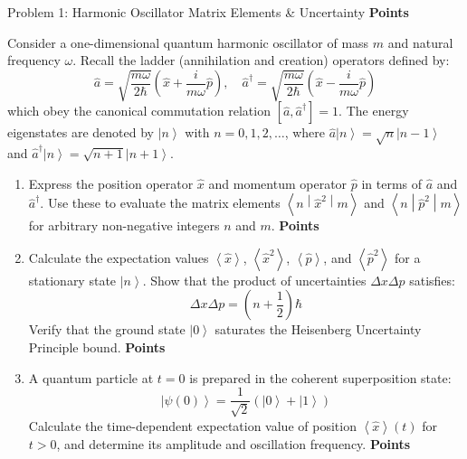 \documentclass[11pt, a4paper, parskip=half]{scrartcl}
\newcommand{\ket}[1]{\left| #1 \right\rangle}
\newcommand{\mel}[3]{\left\langle #1 \middle| #2 \middle| #3 \right\rangle}
\newcommand{\comm}[2]{\left[ #1, #2 \right]}
\newcommand{\expval}[1]{\left\langle #1 \right\rangle}
\newcommand{\points}[1]{\hfill{\sffamily\bfseries\color{QMAccent}\lbrack #1 Points\rbrack}}
\begin{document}
\vspace{2mm}

\begin{problembox}{Problem 1: Harmonic Oscillator Matrix Elements \& Uncertainty \points{30}}

Consider a one-dimensional quantum harmonic oscillator of mass $m$ and natural frequency $\omega$. Recall the ladder (annihilation and creation) operators defined by:
\[
\hat{a} = \sqrt{\frac{m\omega}{2\hbar}} \left( \hat{x} + \frac{i}{m\omega} \hat{p} \right), \quad 
\hat{a}^\dagger = \sqrt{\frac{m\omega}{2\hbar}} \left( \hat{x} - \frac{i}{m\omega} \hat{p} \right)
\]
which obey the canonical commutation relation $\comm{\hat{a}}{\hat{a}^\dagger} = 1$. The energy eigenstates are denoted by $\ket{n}$ with $n = 0, 1, 2, \dots$, where $\hat{a}\ket{n} = \sqrt{n}\ket{n-1}$ and $\hat{a}^\dagger\ket{n} = \sqrt{n+1}\ket{n+1}$.

\begin{enumerate}[label=\bfseries(\alph*), leftmargin=*, itemsep=3pt]
  \item Express the position operator $\hat{x}$ and momentum operator $\hat{p}$ in terms of $\hat{a}$ and $\hat{a}^\dagger$. Use these to evaluate the matrix elements $\mel{n}{\hat{x}^2}{m}$ and $\mel{n}{\hat{p}^2}{m}$ for arbitrary non-negative integers $n$ and $m$. \points{12}
  
  \item Calculate the expectation values $\expval{\hat{x}}$, $\expval{\hat{x}^2}$, $\expval{\hat{p}}$, and $\expval{\hat{p}^2}$ for a stationary state $\ket{n}$. Show that the product of uncertainties $\Delta x \Delta p$ satisfies:
  \[
  \Delta x \Delta p = \left( n + \frac{1}{2} \right) \hbar
  \]
  Verify that the ground state $\ket{0}$ saturates the Heisenberg Uncertainty Principle bound. \points{10}
  
  \item A quantum particle at $t=0$ is prepared in the coherent superposition state:
  \[
  \ket{\psi(0)} = \frac{1}{\sqrt{2}} \left( \ket{0} + \ket{1} \right)
  \]
  Calculate the time-dependent expectation value of position $\expval{\hat{x}}(t)$ for $t > 0$, and determine its amplitude and oscillation frequency. \points{8}
\end{enumerate}

\end{problembox}
\end{document}
